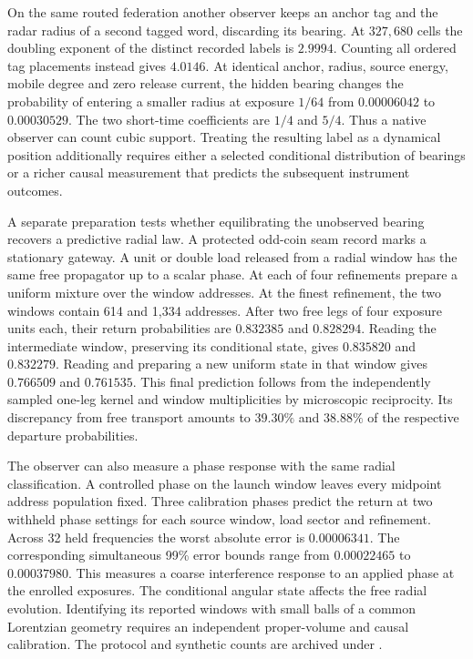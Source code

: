 \documentclass[11pt]{article}
\begin{document}
On the same routed federation another observer keeps an anchor tag and
the radar radius of a second tagged word, discarding its bearing.
At $327{,}680$ cells the doubling exponent of the distinct recorded
labels is $2.9994$. Counting all ordered tag placements instead gives
$4.0146$. At identical anchor, radius, source energy, mobile degree
and zero release current, the hidden bearing changes the probability
of entering a smaller radius at exposure $1/64$ from $0.00006042$
to $0.00030529$. The two short-time coefficients are $1/4$ and $5/4$.
Thus a native observer can count cubic support. Treating the resulting
label as a dynamical position additionally requires either a selected
conditional distribution of bearings or a richer causal measurement
that predicts the subsequent instrument outcomes.

A separate preparation tests whether equilibrating the unobserved bearing
recovers a predictive radial law. A protected odd-coin seam record marks
a stationary gateway. A unit or double load released from a radial
window has the same free propagator up to a scalar phase. At each of
four refinements prepare a uniform mixture over the window addresses.
At the finest refinement, the two windows contain 614 and 1,334
addresses. After two free legs of four exposure units each, their
return probabilities are $0.832385$ and $0.828294$. Reading the
intermediate window, preserving its conditional state, gives $0.835820$
and $0.832279$. Reading and preparing a new uniform state in that window
gives $0.766509$ and $0.761535$. This final prediction follows from
the independently sampled one-leg kernel and window multiplicities by
microscopic reciprocity. Its discrepancy from free transport amounts
to $39.30\%$ and $38.88\%$ of the respective departure probabilities.

The observer can also measure a phase response with the same radial
classification. A controlled phase on the launch window leaves every
midpoint address population fixed. Three calibration phases predict
the return at two withheld phase settings for each source window,
load sector and refinement. Across 32 held frequencies the worst
absolute error is $0.00006341$. The corresponding simultaneous
99\% error bounds range from $0.00022465$ to $0.00037980$. This
measures a coarse interference response to an applied phase at the
enrolled exposures. The conditional angular state affects the
free radial evolution. Identifying its reported windows with small
balls of a common Lorentzian geometry requires an independent
proper-volume and causal calibration. The protocol and synthetic
counts are archived under
.
\end{document}
